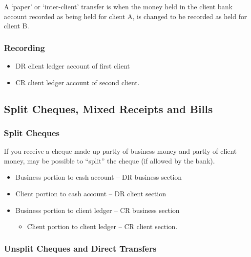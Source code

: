 \documentclass[
]{article}
\providecommand{\tightlist}{%
  \setlength{\itemsep}{0pt}\setlength{\parskip}{0pt}}
\begin{document}
A `paper' or `inter-client' transfer is when the money held in the
client bank account recorded as being held for client A, is changed to
be recorded as held for client B.

\hypertarget{recording}{%
\subsubsection{Recording}\label{recording}}

\begin{itemize}
\tightlist
\item
  DR client ledger account of first client
\item
  CR client ledger account of second client.
\end{itemize}

\hypertarget{split-cheques-mixed-receipts-and-bills}{%
\subsection{Split Cheques, Mixed Receipts and
Bills}\label{split-cheques-mixed-receipts-and-bills}}

\hypertarget{split-cheques}{%
\subsubsection{Split Cheques}\label{split-cheques}}

If you receive a cheque made up partly of business money and partly of
client money, may be possible to ``split'' the cheque (if allowed by the
bank).

\begin{itemize}
\tightlist
\item
  Business portion to cash account -- DR business section
\item
  Client portion to cash account -- DR client section
\item
  Business portion to client ledger -- CR business section

  \begin{itemize}
  \tightlist
  \item
    Client portion to client ledger -- CR client section.
  \end{itemize}
\end{itemize}

\hypertarget{unsplit-cheques-and-direct-transfers}{%
\subsubsection{Unsplit Cheques and Direct
Transfers}\label{unsplit-cheques-and-direct-transfers}}
\end{document}
